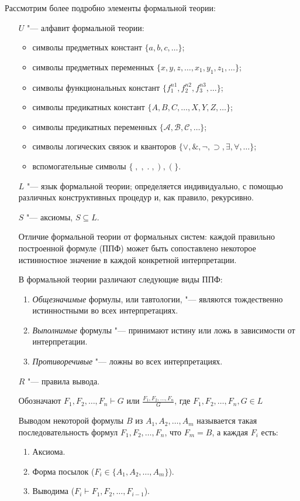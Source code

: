 Рассмотрим более подробно элементы формальной теории:
\begin{itemize}
\item[$U$ "---] алфавит формальной теории:
  \begin{itemize}
  \item символы предметных констант $\{a,b,c,\ldots\}$;
  \item символы предметных переменных
$\{x,y,z,\ldots,x_1,y_1,z_1,\ldots\}$;
  \item символы функциональных констант
$\{f_1^{n1},f_2^{n2},f_3^{n3},\ldots\}$;
  \item символы предикатных констант $\{A,B,C,\ldots,X,Y,Z,\ldots\}$;
  \item символы предикатных переменных $\{\mathcal{A,B,C,\ldots}\}$;
  \item символы логических связок и кванторов
$\{\lor,\&,\lnot,\supset,\exists,\forall,\ldots\}$;
  \item вспомогательные символы $\{\;,\;,\;.\;,\;)\;,\;(\;\}$.
  \end{itemize}
\item[$L$ "---] язык формальной теории; определяется индивидуально, с
помощью различных конструктивных процедур и, как правило, рекурсивно.
\item[$S$ "---] аксиомы, $S\subseteq L$.

  Отличие формальной теории от формальных систем: каждой правильно
построенной формуле (ППФ) может быть сопоставлено некоторое
истинностное значение в каждой конкретной интерпретации.

  В формальной теории различают следующие виды ППФ:
  \begin{enumerate}
  \item \emph{Общезначимые} формулы, или тавтологии, "--- являются
тождественно истинностными во всех интерпретациях.
  \item \emph{Выполнимые} формулы "--- принимают истину или ложь в
зависимости от интерпретации.
  \item \emph{Противоречивые} "--- ложны во всех интерпретациях.
  \end{enumerate}

\item[$R$ "---] правила вывода.

  Обозначают $F_1,F_2,\ldots,F_n\vdash G$ или $\frac
{F_1,F_2,\ldots,F_n} G$, где $F_1,F_2,\ldots,F_n,G\in L$
  
  Выводом некоторой формулы $B$ из $A_1,A_2,\ldots,A_m$ называется
такая последовательность формул $F_1,F_2,\ldots,F_n$, что $F_m=B$, а
каждая $F_i$ есть:
  \begin{enumerate}
  \item Аксиома.
  \item Форма посылок ($F_i\in \{A_1,A_2,\ldots,A_m\}$).
  \item Выводима ($F_i\vdash F_1,F_2,\ldots,F_{i-1}$).
  \end{enumerate}


\end{itemize}
